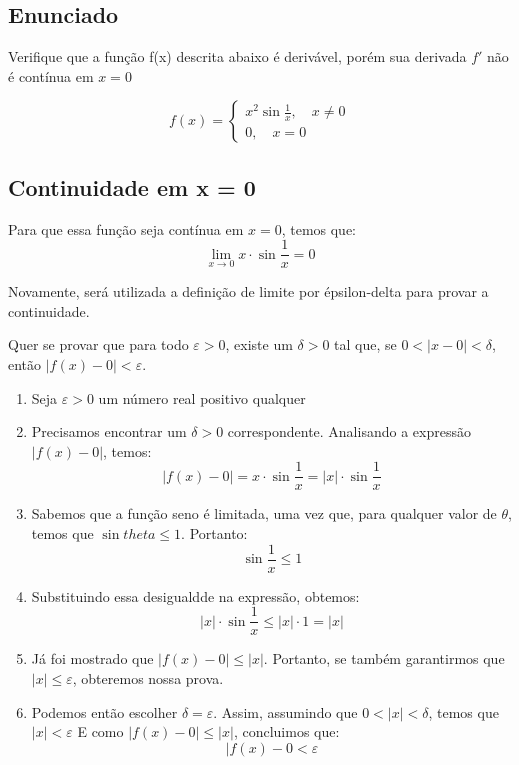 


\subsection{Enunciado}

Verifique que a função f(x) descrita abaixo é derivável, porém sua derivada
$f'$ não é contínua em $x = 0$

\begin{equation*}
    f(x) =
    \begin{cases}
        x^2\sin{\frac{1}{x}}, \quad x \neq 0 \\
        0, \quad x = 0
    \end{cases}
\end{equation*}

\subsection{Continuidade em x = 0}

Para que essa função seja contínua em $x = 0$, temos que:
\[\lim_{x\to0} x\cdot\sin{\frac{1}{x}} = 0\]

Novamente, será utilizada a definição de limite por épsilon-delta para provar a continuidade.

Quer se provar que para todo $\varepsilon > 0$, existe um $\delta > 0$ tal que, se
$0 < |x - 0| < \delta$, então $|f(x) - 0| < \varepsilon$.
\begin{enumerate}
    \item Seja $\varepsilon > 0$ um número real positivo qualquer
    \item Precisamos encontrar um $\delta > 0$ correspondente. Analisando a expressão $|f(x) - 0|$, temos:
    \[|f(x) - 0| = x\cdot\sin{\frac{1}{x}} = |x|\cdot\sin{\frac{1}{x}}\]
    \item Sabemos que a função seno é limitada, uma vez que, para qualquer valor de $\theta$, temos que
    $\sin{theta} \leq 1$. Portanto:
    \[\sin{\frac{1}{x}} \leq 1\]
    \item Substituindo essa desigualdde na expressão, obtemos:
    \[|x|\cdot\sin{\frac{1}{x}} \leq |x|\cdot1 = |x|\]
    \item Já foi mostrado que $|f(x) - 0| \leq |x|$. Portanto, se também garantirmos que
    $|x| \leq \varepsilon$, obteremos nossa prova.
    \item Podemos então escolher $\delta = \varepsilon$. Assim, assumindo que $0 < |x| < \delta$, temos
    que $|x| < \varepsilon$
    E como $|f(x)-0| \leq |x|$, concluimos que:
    \[|f(x)-0 < \varepsilon\]
\end{enumerate}

